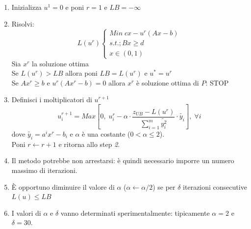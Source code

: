 \begin{enumerate}
	\item Inizializza $u^{1}=0$ e poni $r=1$ e $LB=-\infty$
	\item Risolvi:
	\begin{equation*}
		L(u^{r})
		\begin{cases}
			Min\;cx-u^{r}(Ax-b)\\
			s.t.;Bx\ge d\\
			x\in(0,1)
		\end{cases}
	\end{equation*}
	Sia $x^{r}$ la soluzione ottima\\
	Se $L(u^{r})>LB$ allora poni $LB=L(u^{r})$ e $u^{*}=u^{r}$\\
	Se $Ax^{r}\ge b$ e $u^{r}(Ax^{r}-b)=0$ allora $x^{r}$ è soluzione ottima di $P$: STOP
	\item Definisci i moltiplicatori di $u^{r+1}$
	\begin{equation*}
		u_{i}^{r+1}=Max[0,\;u_{i}^{r}-\alpha \cdot\frac{z_{UB}-L(u^{r})}{\sum_{i=1}^{m}\widetilde{y_{i}^{2}}}\cdot\widetilde{y_{i}}],\;\forall i
	\end{equation*}
	dove $\widetilde{y_{i}}=a^{i}x^{r}-b_{i}$ e $\alpha$ è una costante ($0<\alpha\le 2$).\\
	Poni $r\gets r+1$ e ritorna allo step \textit{2}.
	\item Il metodo potrebbe non arrestarsi: è quindi necessario imporre un numero massimo di iterazioni.
	\item È opportuno diminuire il valore di $\alpha$ ($\alpha\gets\alpha/2$) se per $\delta$ iterazioni consecutive $L(u)\le LB$
	\item I valori di $\alpha$ e $\delta$ vanno determinati sperimentalmente: tipicamente $\alpha=2$ e $\delta=30$.
\end{enumerate}

